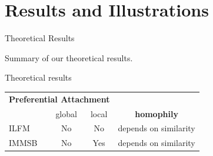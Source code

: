\section{Results and Illustrations}

\begin{frame}[c]{Theoretical Results}

    Summary of our theoretical results. %
    \vspace{1cm}


    \begin{block}{Theoretical results}
	\begin{tabular}{l|cc|c}

        \multicolumn{3}{c}{\hspace{1.3cm}\textbf{Preferential Attachment}}   \\
        \cmidrule(l){2-3} 
        &   global & local  &   \textbf{homophily}      \\
        \hline
        ILFM       & \cellcolor{red!25}No & \cellcolor{red!25}No   & depends on similarity  \\
        IMMSB       & \cellcolor{red!25}No & \cellcolor{green!25}Yes  & depends on similarity \\
    \end{tabular}

    \end{block}

\end{frame}

